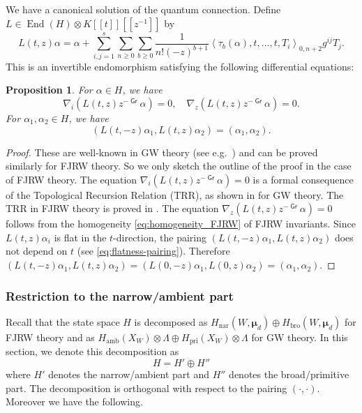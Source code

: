 \documentclass[11pt]{amsart}
\newtheorem{pro}[thm]{Proposition} %
\theoremstyle{definition} %
\theoremstyle{remark} %
\newcommand{\nar}{\operatorname{nar}}
\newcommand{\End}{\operatorname{End}}
\def\corr#1{\left\langle #1 \right\rangle}
\newcommand{\bmu}{\boldsymbol{\mu}}
\newcommand{\amb}{\operatorname{amb}}
\newcommand{\pri}{\operatorname{pri}}
\newcommand{\bro}{\operatorname{bro}}
\newcommand{\grading}{\operatorname{\mathsf{Gr}}} %
\begin{document}
We have a canonical solution of the quantum 
connection. Define $L\in \End(H)\otimes K[\![t]\!][\![z^{-1}]\!]$ 
by 
\begin{equation} 
\label{eq:fundamentalsol} 
L(t,z) \alpha = \alpha + \sum_{i,j=1}^{s} 
\sum_{n\ge 0} \sum_{b\ge 0} \frac{1}{n!(-z)^{b+1}} 
\corr{\tau_{b}(\alpha),t,\dots,t,T_i}_{0,n+2} g^{ij} T_j.  
\end{equation} 
This is an invertible endomorphism satisfying the 
following differential equations:
\begin{pro} 
\label{pro:fundamentalsol} 
For $\alpha \in H$, we have  
\[
\nabla_i(L(t,z) z^{-\grading} \alpha)=0, \quad 
\nabla_z(L(t,z) z^{-\grading} \alpha)=0.  
\] 
For $\alpha_1,\alpha_2\in H$, we have 
\[
\left
(L(t,-z) \alpha_1, L(t,z)\alpha_2
\right) = (\alpha_1,\alpha_2). 
\]
\end{pro}  
\begin{proof} 
These are well-known in GW theory  
(see e.g.\ \cite[Proposition 2.4]{Ir}) and 
can be proved similarly for FJRW theory. 
So we only sketch the outline of the proof 
in the case of FJRW theory. 
The equation $\nabla_i (L(t,z) z^{-\grading}\alpha) =0$ is 
a formal consequence of the Topological Recursion Relation (TRR), 
as shown in \cite[Proposition 2]{Pandharipande:afterGivental} for 
GW theory. 
The TRR in FJRW theory is proved in \cite[Theorem 4.2.8]{FJR1}. 
The equation $\nabla_z (L(t,z) z^{-\grading} \alpha)=0$ 
follows from the homogeneity \eqref{eq:homogeneity_FJRW} 
of FJRW invariants. 
Since $L(t,z) \alpha_i$ is flat in the $t$-direction, 
the pairing $(L(t,-z) \alpha_1, L(t,z) \alpha_2)$ 
does not depend on $t$ (see \eqref{eq:flatness-pairing}). 
Therefore $(L(t,-z)\alpha_1, L(t,z) \alpha_2) = 
(L(0,-z) \alpha_1, L(0,z) \alpha_2) = (\alpha_1,\alpha_2)$. 
\end{proof} 

\subsubsection{Restriction to the narrow/ambient part} 
\label{subsubsec:restr-narrow}

Recall that the state space $H$ is decomposed 
as $H_{\nar}(W,\bmu_d)\oplus H_{\bro}(W,\bmu_d)$ 
for FJRW theory 
and as $H_{\amb}(X_W)\otimes \Lambda 
\oplus H_{\pri}(X_W)\otimes \Lambda$ for 
GW theory. In this section, 
we denote this decomposition as 
\[
H = H' \oplus H'' 
\]
where $H'$ denotes the narrow/ambient part  
and $H''$ denotes the broad/primitive part.  
The decomposition is orthogonal with respect to the 
pairing $(\cdot,\cdot)$. 
Moreover we have the following. 
\end{document}
